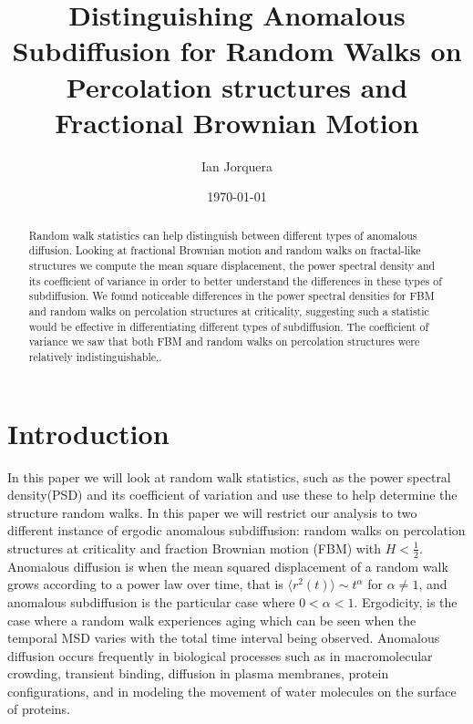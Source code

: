 \documentclass[%
 reprint,
 amsmath,amssymb,
 aps,
]{revtex4-2}
\begin{document}

\title{Distinguishing Anomalous Subdiffusion for Random Walks on Percolation structures and Fractional Brownian Motion}


\author{Ian Jorquera}%
%


\date{\today}%

\begin{abstract}
Random walk statistics can help distinguish between different types of anomalous diffusion. Looking at fractional Brownian motion and random walks on fractal-like structures we compute the mean square displacement, the power spectral density and its coefficient of variance in order to better understand the differences in these types of subdiffusion. We found noticeable differences in the power spectral densities for FBM and random walks on percolation structures at criticality, suggesting such a statistic would be effective in differentiating different types of subdiffusion. The coefficient of variance we saw that both FBM and random walks on percolation structures were relatively indistinguishable,.
\end{abstract}

\maketitle


\section{Introduction}
\label{sec:intro} 
In this paper we will look at random walk statistics, such as the power spectral density(PSD) and its coefficient of variation and use these to help determine the structure random walks. In this paper we will restrict our analysis to two different instance of ergodic anomalous subdiffusion: random walks on percolation structures at criticality and fraction Brownian motion (FBM) with $H< \frac{1}{2}$. Anomalous diffusion is when the mean squared displacement of a random walk grows according to a power law over time, that is $\langle r^2(t)\rangle\sim t^\alpha$ for $\alpha\neq 1$, and anomalous subdiffusion is the particular case where $0< \alpha <1$. Ergodicity, is the case where a random walk experiences aging which can be seen when the temporal MSD varies with the total time interval being observed. Anomalous diffusion occurs frequently in biological processes such as in macromolecular crowding, transient binding\cite{krapf_spectral_2019}, diffusion in plasma membranes\cite{weigel_ergodic_2011}, protein configurations, and in modeling the movement of water molecules on the surface of proteins\cite{krapf_strange_2019}.
\end{document}
